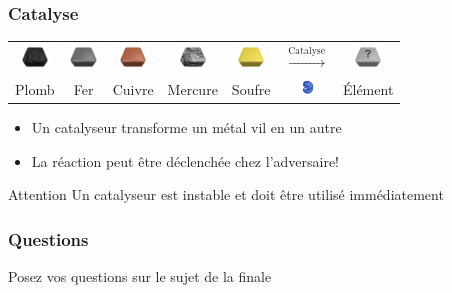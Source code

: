 \documentclass{beamer}
\begin{document}
\begin{frame}
    \frametitle{Catalyse}
    \vspace{1cm}
    \begin{tabular}{ccccccc}
        \includegraphics[width=0.8cm]{../img/material-lead} &
        \includegraphics[width=0.8cm]{../img/material-iron} &
        \includegraphics[width=0.8cm]{../img/material-copper} &
        \includegraphics[width=0.8cm]{../img/material-mercury} &
        \includegraphics[width=0.8cm]{../img/material-sulfur} &
        $\xrightarrow{\text{Catalyse}}$ &
        \includegraphics[width=0.8cm]{../img/material-other}\\
        Plomb & Fer & Cuivre & Mercure & Soufre &
        \includegraphics[width=0.5cm]{../img/material-catalyst} &
        Élément
    \end{tabular}

    \vspace{1cm}
    \begin{itemize}
        \item Un catalyseur transforme un métal vil en un autre
        \item La réaction peut être déclenchée chez l’adversaire!
    \end{itemize}
    \begin{alertblock}{Attention}
        Un catalyseur est instable et doit être utilisé immédiatement
    \end{alertblock}
\end{frame}

\begin{frame}
    \frametitle{Questions}
    Posez vos questions sur le sujet de la finale
\end{frame}
\end{document}
